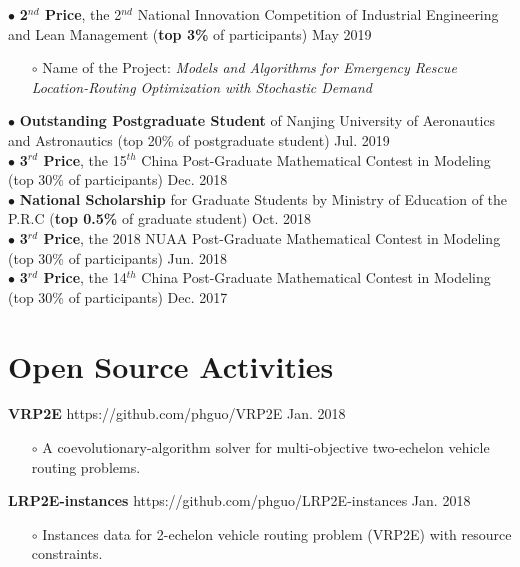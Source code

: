 \documentclass[margin]{res}
\begin{document}
\begin{resume}
$\bullet$ {\bf 2\(^{nd}\) Price}, the 2\(^{nd}\) National Innovation Competition of Industrial Engineering and Lean Management ({\bf top 3\%} of participants) \hfill May 2019 
\begin{itemize}  \itemsep -2pt  %
\item[\(\circ\)] Name of the Project: \textit{Models and Algorithms for Emergency Rescue Location-Routing Optimization with Stochastic Demand}
\end{itemize} \vspace{-1em}

$\bullet$ {\bf Outstanding Postgraduate Student} of Nanjing University of Aeronautics and Astronautics (top 20\% of postgraduate student) \hfill Jul. 2019 \\
$\bullet$ {\bf 3\(^{rd}\) Price}, the 15\(^{th}\) China Post-Graduate Mathematical Contest in Modeling (top 30\% of participants) \hfill Dec. 2018 \\
$\bullet$ {\bf National Scholarship} for Graduate Students by Ministry of Education of the P.R.C ({\bf top 0.5\%} of graduate student) \hfill Oct. 2018 \\
$\bullet$ {\bf 3\(^{rd}\) Price}, the 2018 NUAA Post-Graduate Mathematical Contest in Modeling (top 30\% of participants) \hfill Jun. 2018 \\
$\bullet$ {\bf 3\(^{rd}\) Price}, the 14\(^{th}\) China Post-Graduate Mathematical Contest in Modeling (top 30\% of participants) \hfill Dec. 2017





\section{\sc Open Source Activities} 

\textbf{{VRP2E }} https://github.com/phguo/VRP2E \hfill Jan. 2018
\begin{itemize} \itemsep -2pt
\item[\(\circ\)] A coevolutionary-algorithm solver for multi-objective two-echelon vehicle routing problems.
\end{itemize} \vspace{-.5em}
\textbf{{LRP2E-instances }} https://github.com/phguo/LRP2E-instances \hfill Jan. 2018
\begin{itemize} \itemsep -2pt
\item[\(\circ\)] Instances data for 2-echelon vehicle routing problem (VRP2E) with resource constraints. 
\end{itemize}


\end{resume} 
\end{document}
